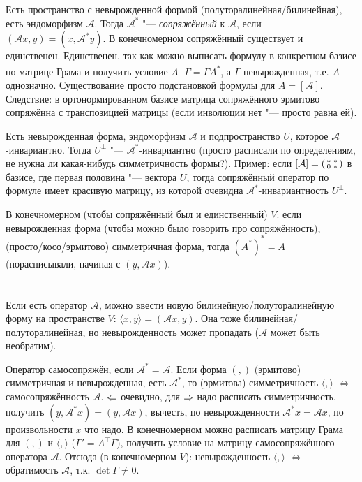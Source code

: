 \section{} %
Есть пространство с невырожденной формой (полуторалинейная/билинейная), есть эндоморфизм $\mathcal{A}$.
Тогда $\mathcal{A}^*$ "--- \textit{сопряжённый} к $\mathcal{A}$, если $(\mathcal{A}x, y) = (x, \mathcal{A}^*y)$.
В конечномерном сопряжённый существует и единственен.
Единственен, так как можно выписать формулу в конкретном базисе по матрице Грама и получить условие $A^\top \Gamma = \Gamma \overline{A^*}$,
а $\Gamma$ невырожденная, т.е. $A$ однозначно.
Существование просто подстановкой формулы для $A=[\mathcal{A}]$.
Следствие: в ортонормированном базисе матрица сопряжённого эрмитово сопряжённа с транспозицией матрицы (если инволюции нет "--- просто равна ей).

Есть невырожденная форма, эндоморфизм $\mathcal{A}$ и подпространство $U$, которое $\mathcal{A}$-инвариантно.
Тогда $U^\bot$ "--- $\mathcal{A}^*$-инвариантно (просто расписали по определениям, \TODO не нужна ли какая-нибудь симметричность формы?).
Пример: если $[\mathcal{A}] = \begin{psmallmatrix}*&*\\0&*\end{psmallmatrix}$ в базисе, где первая половина "--- вектора $U$,
тогда сопряжённый оператор по формуле имеет красивую матрицу, из которой очевидна $\mathcal{A}^*$-инвариантность $U^\bot$.

В конечномерном (чтобы сопряжённый был и единственный) $V$: если невырожденная форма (чтобы можно было говорить про сопряжённость), (просто/косо/эрмитово) симметричная форма,
тогда $(A^*)^*=A$ (порасписывали, начиная с $\overline{(y, \mathcal{A}x)}$).

\section{} %
Если есть оператор $\mathcal A$, можно ввести новую билинейную/полуторалинейную форму на пространстве $V$: $\langle x, y \rangle = (\mathcal{A}x, y)$.
Она тоже билинейная/полуторалинейная, но невырожденность может пропадать ($\mathcal A$ может быть необратим).

Оператор самосопряжён, если $\mathcal{A}^* = \mathcal{A}$.
Если форма $(,)$ (эрмитово) симметричная и невырожденная, есть $\mathcal A^*$, то (эрмитова) симметричность $\langle , \rangle$ $\iff$ самосопряжённость $\mathcal A$.
$\Leftarrow$ очевидно, для $\Rightarrow$ надо расписать симметричность, получить $(y, \mathcal A^* x) = (y, \mathcal A x)$, вычесть, по невырожденности $\mathcal A^* x = \mathcal A x$, по произвольности $x$ что надо.
В конечномерном можно расписать матрицу Грама для $(,)$ и $\langle , \rangle$ ($\Gamma' = A^\top \Gamma$), получить условие на матрицу самосопряжённого оператора $\mathcal A$.
Отсюда (в конечномерном $V$): невырожденность $\langle , \rangle$ $\iff$ обратимость $\mathcal A$, т.к. $\det \Gamma \ne 0$.

